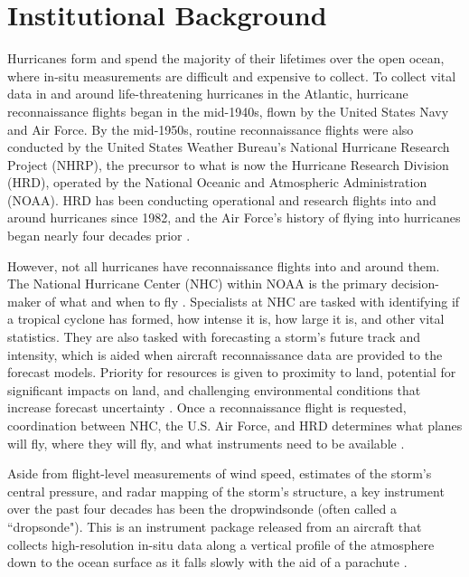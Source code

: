 \documentclass[12pt]{article}%
\begin{document}
\section{Institutional Background} \label{sec:background}

Hurricanes form and spend the majority of their lifetimes over the open ocean, where in-situ measurements are difficult and expensive to collect. To collect vital data in and around life-threatening hurricanes in the Atlantic, hurricane reconnaissance flights began in the mid-1940s, flown by the United States Navy and Air Force. By the mid-1950s, routine reconnaissance flights were also conducted by the United States Weather Bureau’s National Hurricane Research Project (NHRP), the precursor to what is now the Hurricane Research Division (HRD), operated by the National Oceanic and Atmospheric Administration (NOAA). HRD has been conducting operational and research flights into and around hurricanes since 1982, and the Air Force's history of flying into hurricanes began nearly four decades prior \citep{Sheets1990,Marks_Shay1998}.

However, not all hurricanes have reconnaissance flights into and around them. The National Hurricane Center (NHC) within NOAA is the primary decision-maker of what and when to fly \citep{OFCM2024,RappaportEA2009}. Specialists at NHC are tasked with identifying if a tropical cyclone has formed, how intense it is, how large it is, and other vital statistics. They are also tasked with forecasting a storm's future track and intensity, which is aided when aircraft reconnaissance data are provided to the forecast models. Priority for resources is given to proximity to land, potential for significant impacts on land, and challenging environmental conditions that increase forecast uncertainty \citep{Aberson2003, Majumdar2016}. Once a reconnaissance flight is requested, coordination between NHC, the U.S. Air Force, and HRD determines what planes will fly, where they will fly, and what instruments need to be available \citep{OFCM2024}.

Aside from flight-level measurements of wind speed, estimates of the storm's central pressure, and radar mapping of the storm's structure, a key instrument over the past four decades has been the dropwindsonde (often called a ``dropsonde"). This is an instrument package released from an aircraft that collects high-resolution in-situ data along a vertical profile of the atmosphere down to the ocean surface as it falls slowly with the aid of a parachute \citep{Hock_Franklin1999}.
\end{document}
